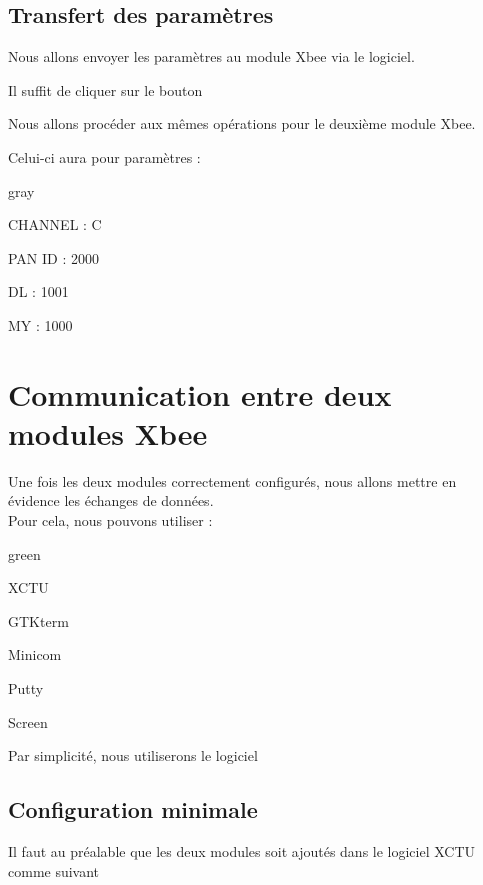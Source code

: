 {\subsection{Transfert des paramètres}

Nous allons envoyer les paramètres au module Xbee via le logiciel.

Il suffit de cliquer sur le bouton 


Nous allons procéder aux mêmes opérations pour le deuxième module Xbee.

Celui-ci aura pour paramètres : 

\begin{items}{gray}{\faGear}
\item CHANNEL : C
\item PAN ID : 2000
\item DL : 1001
\item MY : 1000
\end{items}


\section{Communication entre deux modules Xbee}

Une fois les deux modules correctement configurés, nous allons mettre en évidence les échanges de données.\\

Pour cela, nous pouvons utiliser :

\begin{items}{green}{\faLeaf}
 \item XCTU
\item  GTKterm
\item  Minicom
\item  Putty
\item  Screen
\end{items}

Par simplicité, nous utiliserons le logiciel 

\subsection{Configuration minimale}

Il faut au préalable que les deux modules soit ajoutés dans le logiciel XCTU comme suivant



}
